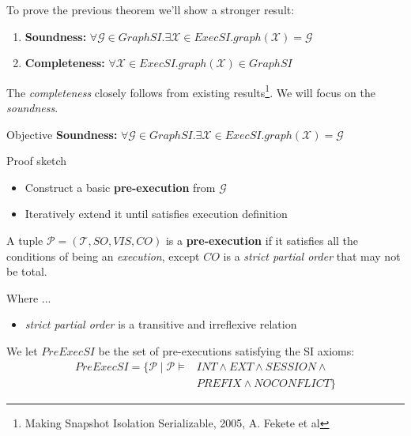 \documentclass{beamer}
\begin{document}
\begin{frame}
	To prove the previous theorem we'll show a stronger result:
	\begin{theorem}
		\begin{enumerate}
			\item \textbf{Soundness:} $ \forall \mathcal{G} \in GraphSI. \exists \mathcal{X} \in ExecSI. graph(\mathcal{X}) = \mathcal{G} $ 
			\item \textbf{Completeness:} $ \forall \mathcal{X} \in ExecSI. graph(\mathcal{X}) \in GraphSI$
		\end{enumerate}
	\end{theorem}
	The \textit{completeness} closely follows from existing results\footnote{Making Snapshot Isolation Serializable, 2005, A. Fekete et al}. We will focus on the \textit{soundness}.
	
\end{frame}

\begin{frame}
	\begin{block}{Objective}
		\textbf{Soundness:} $ \forall \mathcal{G} \in GraphSI. \exists \mathcal{X} \in ExecSI. graph(\mathcal{X}) = \mathcal{G} $ 	
	\end{block}
	\begin{block}{Proof sketch}
		\begin{itemize}
			\item Construct a basic \textbf{pre-execution} from $\mathcal{G}$
			\item Iteratively extend it until satisfies execution definition
		\end{itemize}		
	\end{block}
\end{frame}

\begin{frame}
	\begin{definition}
		A tuple $\mathcal{P} = (\mathcal{T}, SO, VIS, CO) $ is a \textbf{pre-execution} if it satisfies all the conditions of being an \emph{execution}, except $CO$ is a \textit{strict partial order} that may not be total.
	\end{definition}
	Where ...
	\begin{itemize}
		\item \textit{strict partial order} is a transitive and irreflexive relation
	\end{itemize}
\end{frame}

\begin{frame}
	\begin{definition}
		We let $PreExecSI$ be the set of pre-executions satisfying the SI axioms:
		$$
		\begin{aligned}
			PreExecSI = \{ \mathcal{P} \mid \mathcal{P} \vDash & INT \wedge EXT \wedge SESSION \wedge \\
			& PREFIX \wedge NOCONFLICT \}
		\end{aligned}
		$$
	\end{definition}
\end{frame}
\end{document}
